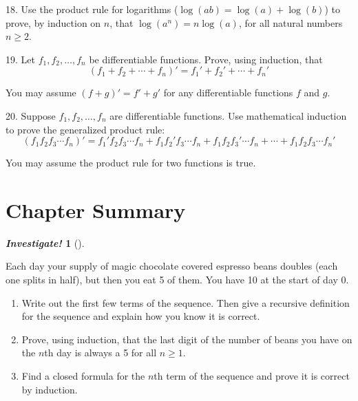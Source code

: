 \documentclass[10pt,]{book}
\theoremstyle{plain}
\theoremstyle{definition}
\theoremstyle{definition}
\newtheorem{investigation}[project]{\emph{Investigate!}}
\theoremstyle{definition}
\numberwithin{equation}{chapter}
\begin{document}
\begin{exerciselist}
%
\par\smallskip
\item[18.]\hypertarget{exercise-185}{}
Use the product rule for logarithms (\(\log(ab) = \log(a) + \log(b)\)) to prove, by induction on \(n\), that \(\log(a^n) = n \log(a)\), for all natural numbers \(n \ge 2\).
%
\par\smallskip
\item[19.]\hypertarget{exercise-186}{}
Let \(f_1, f_2,\ldots, f_n\) be differentiable functions. Prove, using induction, that
\begin{equation*}
  (f_1 + f_2 + \cdots + f_n)' = f_1' + f_2' + \cdots + f_n'
\end{equation*}
%
\par

You may assume \((f+g)' = f' + g'\) for any differentiable functions \(f\) and \(g\).
%
\par\smallskip
\item[20.]\hypertarget{exercise-187}{}
Suppose \(f_1, f_2, \ldots, f_n\) are differentiable functions. Use mathematical induction to prove the generalized product rule:
\begin{equation*}
  (f_1 f_2 f_3 \cdots f_n)' = f_1' f_2 f_3 \cdots f_n + f_1 f_2' f_3 \cdots f_n + f_1 f_2 f_3' \cdots f_n + \cdots + f_1 f_2 f_3 \cdots f_n'
\end{equation*}
%
\par

You may assume the product rule for two functions is true.
%
\par\smallskip
\end{exerciselist}
\typeout{************************************************}
\typeout{************************************************}
\section[Chapter Summary]{Chapter Summary}\label{sec_sequences-conc}
\begin{investigation}[]\label{investigation-24}

        Each day your supply of magic chocolate covered espresso beans doubles (each one splits in half), but then you eat 5 of them. You have 10 at the start of day 0.
        \leavevmode%
\begin{enumerate}
\item\hypertarget{li-948}{}
              Write out the first few terms of the sequence. Then give a recursive definition for the sequence and explain how you know it is correct.
\item\hypertarget{li-949}{}
              Prove, using induction, that the last digit of the number of beans you have on the \(n\)th day is always a 5 for all \(n \ge 1\).
\item\hypertarget{li-950}{}
              Find a closed formula for the \(n\)th term of the sequence and prove it is correct by induction.
\end{enumerate}

\end{investigation}
\end{document}
